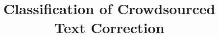 \documentclass{sig-alternate}
\begin{document}
%

\title{ Classification of Crowdsourced Text Correction}

%
%
%
%
%
\end{document}
